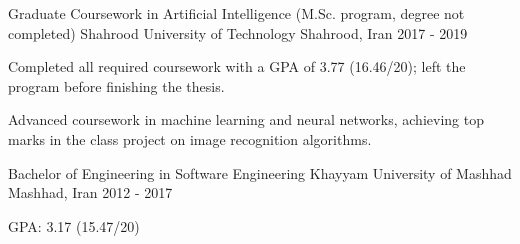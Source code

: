

\begin{cventries}

  \cventry
    {Graduate Coursework in Artificial Intelligence (M.Sc. program, degree not completed)} %
    {Shahrood University of Technology} %
    {Shahrood, Iran} %
    {2017 - 2019} %
    {
      \begin{cvitems} %
      	\item {Completed all required coursework with a GPA of 3.77 (16.46/20); left the program before finishing the thesis.}
      	\item{Advanced coursework in machine learning and neural networks, achieving top marks in the class project on image recognition algorithms.}
      \end{cvitems}
    }
    
    \cventry
    {Bachelor of Engineering in Software Engineering} %
    {Khayyam University of Mashhad} %
    {Mashhad, Iran} %
    {2012 - 2017} %
    {
    \begin{cvitems} %
    	\item {GPA: 3.17 (15.47/20)}
    \end{cvitems}
    }

\end{cventries}
